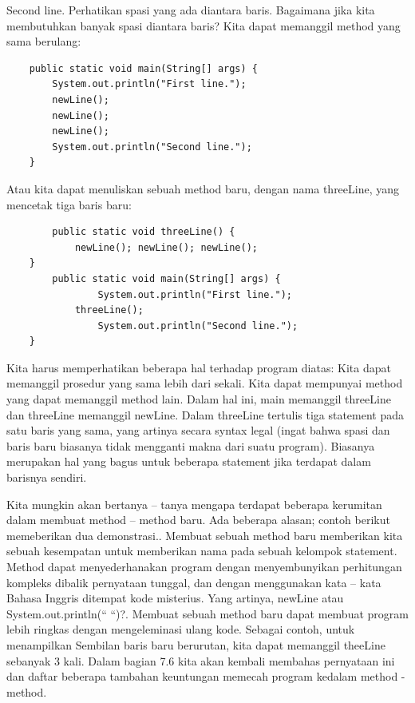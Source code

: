 	Second line.\newline \newline
Perhatikan spasi yang ada diantara baris. Bagaimana jika kita membutuhkan banyak spasi diantara baris? Kita dapat memanggil method yang sama berulang:\newline
\begin{lstlisting}
	public static void main(String[] args) {
		System.out.println("First line.");
		newLine();
		newLine();
		newLine();
		System.out.println("Second line.");
	}
\end{lstlisting}
Atau kita dapat menuliskan sebuah method baru, dengan nama threeLine, yang mencetak tiga baris baru:\newline
\begin{lstlisting} 
		public static void threeLine() {
			newLine(); newLine(); newLine();
	}
		public static void main(String[] args) {
				System.out.println("First line.");
			threeLine();
				System.out.println("Second line.");	
	}
\end{lstlisting}
Kita harus memperhatikan beberapa hal terhadap program diatas:\newline \newline
\textbullet	Kita dapat memanggil prosedur yang sama lebih dari sekali.\newline \newline
\textbullet	Kita dapat mempunyai method yang dapat memanggil method lain. Dalam hal ini, main memanggil threeLine dan threeLine memanggil newLine.\newline \newline
\textbullet	Dalam threeLine tertulis tiga statement pada satu baris yang sama, yang artinya secara syntax legal (ingat bahwa spasi dan baris baru biasanya tidak mengganti makna dari suatu program). Biasanya merupakan hal yang bagus untuk beberapa statement jika terdapat dalam barisnya sendiri.\newline

Kita mungkin akan bertanya – tanya mengapa terdapat beberapa kerumitan dalam membuat method – method baru.
Ada beberapa alasan; contoh berikut memeberikan dua demonstrasi.\newline {}.	Membuat sebuah method baru memberikan kita sebuah kesempatan untuk memberikan nama pada sebuah kelompok statement. Method dapat menyederhanakan program dengan menyembunyikan perhitungan kompleks dibalik pernyataan tunggal, dan dengan menggunakan kata – kata Bahasa Inggris ditempat kode misterius. Yang artinya, newLine atau System.out.println(“ “)?\newline {}.	Membuat sebuah method baru dapat membuat program lebih ringkas dengan mengeleminasi ulang kode. Sebagai contoh, untuk menampilkan Sembilan baris baru berurutan, kita dapat memanggil theeLine sebanyak 3 kali.\newline \newline
Dalam bagian 7.6 kita akan kembali membahas pernyataan ini dan daftar beberapa tambahan keuntungan memecah program kedalam method - method.

